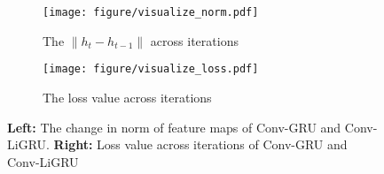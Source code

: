 \begin{figure*}[htbp]
    \centering
    \begin{subfigure}{0.4\textwidth}
        \texttt{[image: figure/visualize\_norm.pdf]}
        \caption{The $\|h_t - h_{t-1}\|$ across iterations}
        \label{fig:visualize norm}
    \end{subfigure}
    \hfill
    \begin{subfigure}{0.55\textwidth}
        \texttt{[image: figure/visualize\_loss.pdf]}
        \caption{The loss value across iterations}
        \label{fig:visualize loss}
    \end{subfigure}
    \caption{\textbf{Left:} The change in norm of feature maps of Conv-GRU and Conv-LiGRU. \textbf{Right:} Loss value across iterations of Conv-GRU and Conv-LiGRU}
    \label{fig:layer_norm}
\end{figure*}



